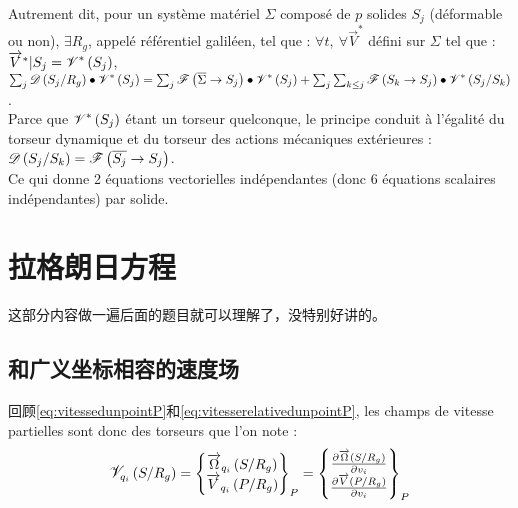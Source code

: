 \documentclass[UTF8]{ctexart}%
\begin{document}
Autrement dit, pour un système matériel $\Sigma$ composé de $p$ solides $S_j$ (déformable ou non), $\exists R_g$, appelé référentiel galiléen, tel que : $\forall t,\ \forall\overrightarrow{V}^{\ast}$ défini sur $\Sigma$ tel que : $\overrightarrow{V}^{\ast}|S_j=\mathlarger{\mathscr{V}}^{\ast}\left(S_j\right)$,\\
$\sum_j \mathlarger{\mathscr{D}}\left(S_j/R_g\right)\bullet \mathlarger{\mathscr{V}}^{\ast}\left(S_j\right)=\sum_j \mathlarger{\mathscr{F}}\left(\overline{\Sigma}\rightarrow S_j\right)\bullet \mathlarger{\mathscr{V}}^{\ast}\left(S_j\right)+\sum_j\sum_{k\le j}\mathlarger{\mathscr{F}}\left(S_k\rightarrow S_j\right)\bullet \mathlarger{\mathscr{V}}^{\ast}\left(S_j/S_k\right)$.\\

Parce que $\mathlarger{\mathscr{V}}^{\ast}\left(S_j\right)$ étant un torseur quelconque, le principe conduit à l'égalité du torseur dynamique et du torseur des actions mécaniques extérieures : $\mathlarger{\mathscr{D}}\left(S_j/S_k\right)=\mathlarger{\mathscr{F}}\left(\overline{S_j}\rightarrow S_j\right)$.\\

Ce qui donne 2 équations vectorielles indépendantes (donc 6 équations scalaires indépendantes) par solide.

\section{拉格朗日方程}
\label{sec:拉格朗日方程}
这部分内容做一遍后面的题目就可以理解了，没特别好讲的。

\subsection{和广义坐标相容的速度场}
\label{sec:和广义坐标相容的速度场}
回顾\cref{eq:vitessedunpointP}和\cref{eq:vitesserelativedunpointP}, les champs de vitesse partielles sont donc des torseurs que l'on note :
\begin{equation}
\mathlarger{\mathscr{V}}_{q_i}\left(S/R_g\right)=\left\{\begin{matrix}
  \overrightarrow{\Omega}_{q_i}\left(S/R_g\right) \\
  \overrightarrow{V}_{q_i}\left(P/R_g\right)
 \end{matrix} \right\}_P=\left\{\begin{matrix}
  \frac{\partial \overrightarrow{\Omega}\left(S/R_g\right)}{\partial v_i} \\
  \frac{\partial \overrightarrow{V}\left(P/R_g\right)}{\partial v_i}
 \end{matrix} \right\}_P
\end{equation}
\end{document}
